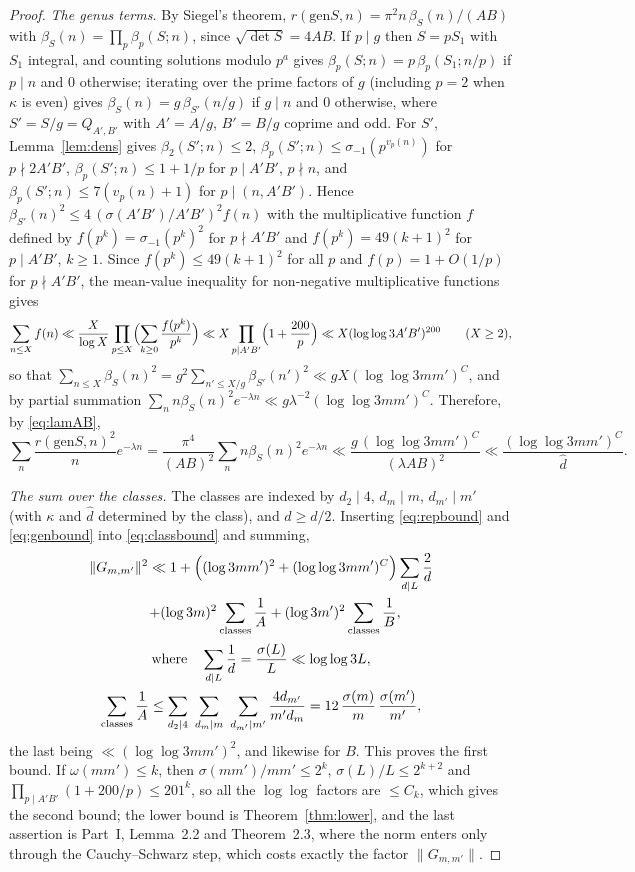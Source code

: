 ﻿\documentclass[11pt]{amsart}
\theoremstyle{remark}
\newcommand{\gen}{\mathrm{gen}}
\newcommand{\rk}{r}
\begin{document}
\begin{proof}
\emph{The genus terms.} By Siegel's theorem, $\rk(\gen S,n)=\pi^2n\,\beta_S(n)/(AB)$ with $\beta_S(n)=\prod_p\beta_p(S;n)$, since $\sqrt{\det S}=4AB$. If $p\mid g$ then $S=pS_1$ with $S_1$ integral, and counting solutions modulo $p^a$ gives $\beta_p(S;n)=p\,\beta_p(S_1;n/p)$ if $p\mid n$ and $0$ otherwise; iterating over the prime factors of $g$ (including $p=2$ when $\kappa$ is even) gives $\beta_S(n)=g\,\beta_{S'}(n/g)$ if $g\mid n$ and $0$ otherwise, where $S'=S/g=Q_{A',B'}$ with $A'=A/g$, $B'=B/g$ coprime and odd. For $S'$, Lemma~\ref{lem:dens} gives $\beta_2(S';n)\le2$, $\beta_p(S';n)\le\sigma_{-1}(p^{v_p(n)})$ for $p\nmid2A'B'$, $\beta_p(S';n)\le1+1/p$ for $p\mid A'B'$, $p\nmid n$, and $\beta_p(S';n)\le7(v_p(n)+1)$ for $p\mid(n,A'B')$. Hence $\beta_{S'}(n)^2\le4\,(\sigma(A'B')/A'B')^2f(n)$ with the multiplicative function $f$ defined by $f(p^k)=\sigma_{-1}(p^k)^2$ for $p\nmid A'B'$ and $f(p^k)=49(k+1)^2$ for $p\mid A'B'$, $k\ge1$. Since $f(p^k)\le49(k+1)^2$ for all $p$ and $f(p)=1+O(1/p)$ for $p\nmid A'B'$, the mean-value inequality for non-negative multiplicative functions \cite[Theorem~01]{HT} gives
\[
\sum_{n\le X}f(n)\ll\frac X{\log X}\prod_{p\le X}\Bigl(\sum_{k\ge0}\frac{f(p^k)}{p^k}\Bigr)\ll X\prod_{p\mid A'B'}\Bigl(1+\frac{200}p\Bigr)\ll X(\log\log3A'B')^{200}\qquad(X\ge2),
\]
so that $\sum_{n\le X}\beta_S(n)^2=g^2\sum_{n'\le X/g}\beta_{S'}(n')^2\ll gX(\log\log3mm')^{C}$, and by partial summation $\sum_nn\beta_S(n)^2e^{-\lambda n}\ll g\lambda^{-2}(\log\log3mm')^C$. Therefore, by \eqref{eq:lamAB},
\begin{equation}\label{eq:genbound}
\sum_n\frac{\rk(\gen S,n)^2}n e^{-\lambda n}=\frac{\pi^4}{(AB)^2}\sum_nn\beta_S(n)^2e^{-\lambda n}\ll\frac{g\,(\log\log3mm')^C}{(\lambda AB)^2}\ll\frac{(\log\log3mm')^C}{\hat d}.
\end{equation}

\emph{The sum over the classes.} The classes are indexed by $d_2\mid4$, $d_m\mid m$, $d_{m'}\mid m'$ (with $\kappa$ and $\hat d$ determined by the class), and $\hat d\ge d/2$. Inserting \eqref{eq:repbound} and \eqref{eq:genbound} into \eqref{eq:classbound} and summing,
\begin{gather*}
\|G_{m,m'}\|^2\ll1+\Bigl((\log3mm')^2+(\log\log3mm')^C\Bigr)\sum_{d\mid L}\frac{2}{d}\\ \qquad+(\log3m)^2\sum_{\text{classes}}\frac1A+(\log3m')^2\sum_{\text{classes}}\frac1B ,\\[2pt]
\text{where}\quad
\sum_{d\mid L}\frac1d=\frac{\sigma(L)}L\ll\log\log3L,\\
\sum_{\text{classes}}\frac1A\le\sum_{d_2\mid4}\ \sum_{d_m\mid m}\ \sum_{d_{m'}\mid m'}\frac{4d_{m'}}{m'd_m}=12\,\frac{\sigma(m)}m\,\frac{\sigma(m')}{m'},
\end{gather*}
the last being $\ll(\log\log3mm')^2$, and likewise for $B$. This proves the first bound. If $\omega(mm')\le k$, then $\sigma(mm')/mm'\le2^k$, $\sigma(L)/L\le2^{k+2}$ and $\prod_{p\mid A'B'}(1+200/p)\le201^k$, so all the $\log\log$ factors are $\le C_k$, which gives the second bound; the lower bound is Theorem~\ref{thm:lower}, and the last assertion is Part~I, Lemma~2.2 and Theorem~2.3, where the norm enters only through the Cauchy--Schwarz step, which costs exactly the factor $\|G_{m,m'}\|$.
\end{proof}
\end{document}
